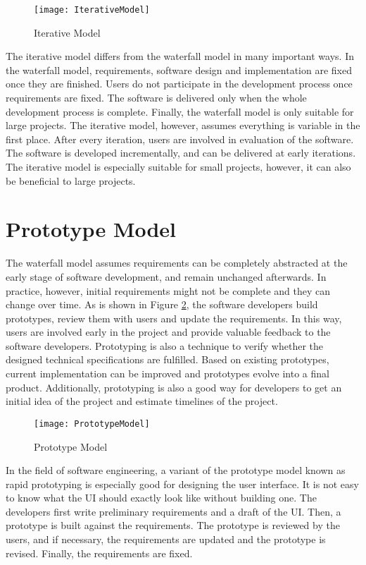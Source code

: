 \begin{figure}[htb]
\centering
\texttt{[image: IterativeModel]}
\caption{Iterative Model\label{fig:Iterative Model}}
\end{figure}

The iterative model differs from the waterfall model in many important ways. In the waterfall model, requirements, software design and implementation are fixed once they are finished. Users do not participate in the development process once requirements are fixed. The software is delivered only when the whole development process is complete. Finally, the waterfall model is only suitable for large projects. The iterative model, however, assumes everything is variable in the first place. After every iteration, users are involved in evaluation of the software. The software is developed incrementally, and can be delivered at early iterations. The iterative model is especially suitable for small projects, however, it can also be beneficial to large projects.

\section{Prototype Model}
The waterfall model assumes requirements can be completely abstracted at the early stage of software development, and remain unchanged afterwards. In practice, however, initial requirements might not be complete and they can change over time. As is shown in Figure \ref{fig:Prototype Model}, the software developers build prototypes, review them with users and update the requirements. In this way, users are involved early in the project and provide valuable feedback to the software developers. Prototyping is also a technique to verify whether the designed technical specifications are fulfilled. Based on existing prototypes, current implementation can be improved and prototypes evolve into a final product. Additionally, prototyping is also a good way for developers to get an initial idea of the project and estimate timelines of the project.

\begin{figure}[htb]
\centering
\texttt{[image: PrototypeModel]}
\caption{Prototype Model\label{fig:Prototype Model}}
\end{figure}

In the field of software engineering, a variant of the prototype model known as rapid prototyping is especially good for designing the user interface. It is not easy to know what the UI should exactly look like without building one. The developers first write preliminary requirements and a draft of the UI. Then, a prototype is built against the requirements. The prototype is reviewed by the users, and if necessary, the requirements are updated and the prototype is revised. Finally, the requirements are fixed.

